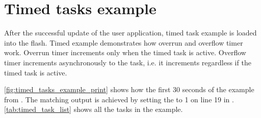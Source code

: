 \section{Timed tasks example}

After the successful update of the user application, timed task example is loaded into the flash. Timed example demonstrates how overrun and overflow timer work. Overrun timer increments only when the timed task is active. Overflow timer increments asynchronously to the task, i.e. it increments regardless if the timed task is active. 

\autoref{fig:timed_tasks_example_print} shows how the first 30 seconds of the example from . The matching output is achieved by setting the  to 1 on line 19 in . \autoref{tab:timed_task_list} shows all the tasks in the example.

\begin{table}[H]
\centering
{}
\caption{All timed tasks in demonstration}
\label{tab:timed_task_list}
\end{table}

